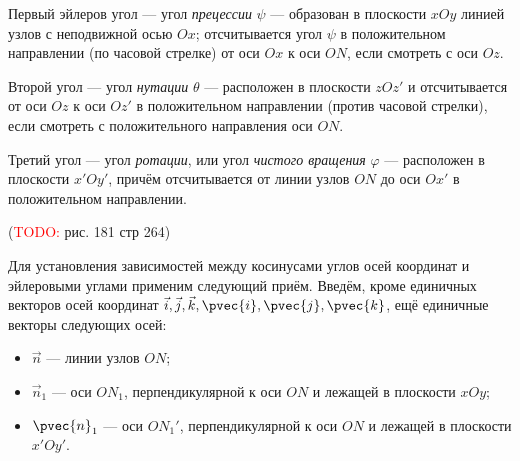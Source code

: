 Первый эйлеров угол --- угол \textit{прецессии} $\psi$ --- образован в плоскости
$xOy$ линией узлов с неподвижной осью $Ox$; отсчитывается угол $\psi$ в
положительном направлении (по часовой стрелке) от оси $Ox$ к оси $ON$, если
смотреть с оси $Oz$.

Второй угол --- угол \textit{нутации} $\theta$ --- расположен в плоскости $zOz'$
и отсчитывается от оси $Oz$ к оси $Oz'$ в положительном направлении (против
часовой стрелки), если смотреть с положительного направления оси $ON$.

Третий угол --- угол \textit{ротации}, или угол \textit{чистого вращения}
$\varphi$ --- расположен в плоскости $x'Oy'$, причём отсчитывается от линии
узлов $ON$ до оси $Ox'$ в положительном направлении.

(\textcolor{red}{TODO:} рис. 181 стр 264)

Для установления зависимостей между косинусами углов осей координат и эйлеровыми
углами применим следующий приём. Введём, кроме единичных векторов осей координат
$\vec{i}, \vec{j}, \vec{k}, \pvec{i}, \pvec{j}, \pvec{k}$, ещё единичные векторы
следующих осей:
\begin{itemize}
  \item $\vec{n}$ --- линии узлов $ON$;
  \item $\vec{n}_1$ --- оси $ON_1$, перпендикулярной к оси $ON$ и лежащей в
    плоскости $xOy$;
  \item $\pvec{n}_1$ --- оси $ON_1'$, перпендикулярной к оси $ON$ и лежащей в
    плоскости $x'Oy'$.
\end{itemize}

